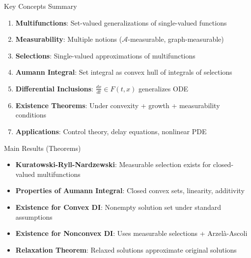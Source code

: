 \documentclass[aspectratio=169,10pt]{beamer}
\theoremstyle{definition}
\begin{document}
\begin{frame}{Key Concepts Summary}

\begin{enumerate}
    \item \textbf{Multifunctions}: Set-valued generalizations of single-valued functions

    \item \textbf{Measurability}: Multiple notions ($\mathcal{A}$-measurable, graph-measurable)

    \item \textbf{Selections}: Single-valued approximations of multifunctions

    \item \textbf{Aumann Integral}: Set integral as convex hull of integrals of selections

    \item \textbf{Differential Inclusions}: $\frac{dx}{dt} \in F(t, x)$ generalizes ODE

    \item \textbf{Existence Theorems}: Under convexity + growth + measurability conditions

    \item \textbf{Applications}: Control theory, delay equations, nonlinear PDE
\end{enumerate}

\end{frame}

\begin{frame}{Main Results (Theorems)}

\begin{itemize}
    \item \textbf{Kuratowski-Ryll-Nardzewski}: Measurable selection exists for closed-valued multifunctions

    \item \textbf{Properties of Aumann Integral}: Closed convex sets, linearity, additivity

    \item \textbf{Existence for Convex DI}: Nonempty solution set under standard assumptions

    \item \textbf{Existence for Nonconvex DI}: Uses measurable selections + Arzelà-Ascoli

    \item \textbf{Relaxation Theorem}: Relaxed solutions approximate original solutions
\end{itemize}

\end{frame}
\end{document}
